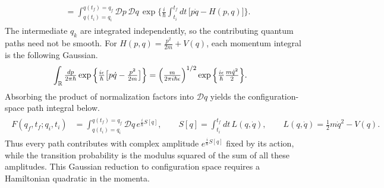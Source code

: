 \documentclass[../QFT_main.tex]{subfiles}
\begin{document}
\begin{mytheorem}
{\begin{align}
\begin{aligned}
    &= \int_{q(t_i)=q_i}^{q(t_f)=q_f}\mathcal{D}p\,\mathcal{D}q\,\exp\Bigg\{\tfrac{i}{\hbar}\int_{t_i}^{t_f}dt\,\big[p\dot q-H(p,q)\big]\Bigg\}.
\end{aligned}\end{align}}
The intermediate $q_k$ are integrated independently, so the contributing quantum paths need not be smooth.
For $H(p,q)=\tfrac{p^2}{2m}+V(q)$, each momentum integral is the following Gaussian.
{\small\begin{align}\begin{aligned}
    \int_{\mathbb{R}}\tfrac{dp}{2\pi\hbar}\exp\Big\{\tfrac{i\epsilon}{\hbar}\big[p\dot q-\tfrac{p^2}{2m}\big]\Big\} &= \Big(\tfrac{m}{2\pi i\hbar\epsilon}\Big)^{1/2}\exp\Big\{\tfrac{i\epsilon}{\hbar}\tfrac{m\dot q^2}{2}\Big\}.
\end{aligned}\end{align}}
Absorbing the product of normalization factors into $\mathcal{D}q$ yields the configuration-space path integral below.
{\small\begin{align}\begin{aligned}
    F(q_f,t_f;q_i,t_i) &= \int_{q(t_i)=q_i}^{q(t_f)=q_f}\mathcal{D}q\,e^{\tfrac{i}{\hbar}S[q]}, \qquad S[q] = \int_{t_i}^{t_f}dt\,L(q,\dot q), \qquad L(q,\dot q) = \tfrac12m\dot q^2-V(q).
\end{aligned}\end{align}}
Thus every path contributes with complex amplitude $e^{\tfrac{i}{\hbar}S[q]}$ fixed by its action, while the transition probability is the modulus squared of the sum of all these amplitudes.
This Gaussian reduction to configuration space requires a Hamiltonian quadratic in the momenta.
\end{mytheorem}
\end{document}
